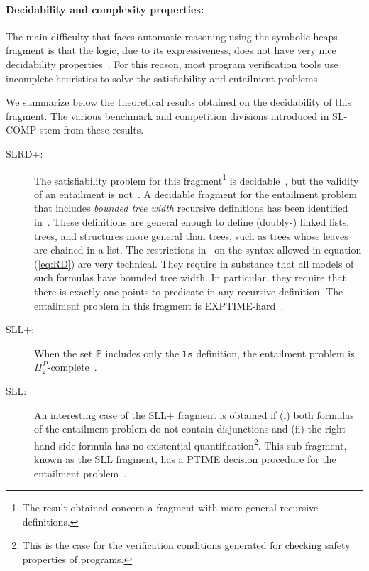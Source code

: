\documentclass[twoside,11pt]{article}
\newcommand{\preds}{\mathbb{P}}
\newcommand{\ls}{\mathtt{ls}}
\begin{document}
\paragraph{Decidability and complexity properties:}
The main difficulty that faces automatic reasoning using the symbolic heaps fragment is that the logic, 
due to its expressiveness, does not have very nice decidability properties~\cite{AntonopoulosGHKO14}.
For this reason, most program verification tools use incomplete heuristics to solve the satisfiability and entailment problems.

We summarize below the theoretical results obtained on the decidability of this fragment.
The various benchmark and competition divisions introduced in SL-COMP stem from these results.
\begin{description}
\item[SLRD+:]
The satisfiability problem for this fragment\footnote{The result obtained concern a fragment with more general recursive definitions.} is decidable~\cite{BrotherstonFGNP13},
but the validity of an entailment is not~\cite{AntonopoulosGHKO14}.
%
A decidable fragment for the entailment problem that includes \emph{bounded tree width} recursive definitions has been identified in~\cite{IosifRS13}.
These definitions are general enough to define (doubly-) linked lists, trees,
and structures more general than trees, such as trees whose leaves are chained in
a list. 
The restrictions in~\cite{IosifRS13} on the syntax allowed in equation (\ref{eq:RD}) are very technical. They require in substance that all models of such formulas have bounded tree width. 
In particular, they require that there is exactly one points-to predicate in any recursive definition.
The entailment problem in this fragment is EXPTIME-hard~\cite{AntonopoulosGHKO14}.

\item[SLL+:]
When the set $\preds$ includes only the $\ls$ definition, 
the entailment problem is $\Pi^P_2$-complete~\cite{AntonopoulosGHKO14}.

\item[SLL:]
An interesting case of the SLL+ fragment is obtained if 
(i) both formulas of the entailment problem do not contain disjunctions and 
(ii) the right-hand side formula has no existential quantification\footnote{This is the case for the verification conditions generated for checking safety properties of programs.}. 
This sub-fragment, known as the SLL fragment, has a PTIME decision procedure for the entailment problem~\cite{CookHOPW11}.
\end{description}
\end{document}
